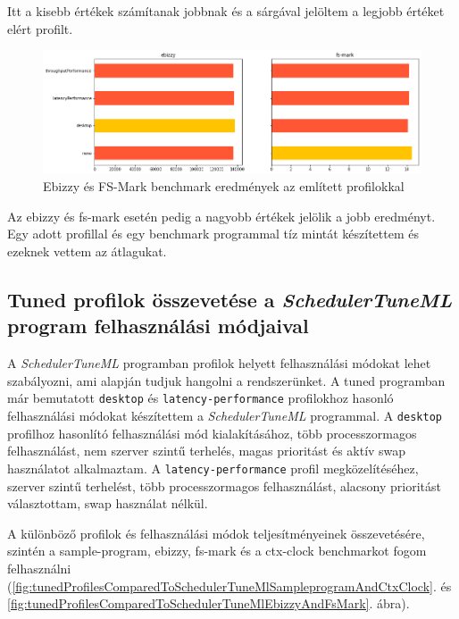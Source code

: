 Itt a kisebb értékek számítanak jobbnak és a sárgával jelöltem a legjobb értéket elért profilt.

\begin{figure}[h!]
\centering
\includegraphics[width=\textwidth]{images/ebizzyAndFsMark.png}
\caption{Ebizzy és FS-Mark benchmark eredmények az említett profilokkal}
\label{fig:tunedProfilesEbizzyAndFsmark}
\end{figure}

Az ebizzy és fs-mark esetén pedig a nagyobb értékek jelölik a jobb eredményt.
Egy adott profillal és egy benchmark programmal tíz mintát készítettem és ezeknek vettem az átlagukat.

\subsection{Tuned profilok összevetése a \textit{SchedulerTuneML} program felhasználási módjaival}

A \textit{SchedulerTuneML} programban profilok helyett felhasználási módokat lehet szabályozni, ami alapján tudjuk hangolni a rendszerünket. A tuned programban már bemutatott \texttt{desktop} és \texttt{latency-performance} profilokhoz hasonló felhasználási módokat készítettem a \textit{SchedulerTuneML} programmal. A \texttt{desktop} profilhoz hasonlító felhasználási mód kialakításához, több processzormagos felhasználást, nem szerver szintű terhelés, magas prioritást és aktív swap használatot alkalmaztam. A \texttt{latency-performance} profil megközelítéséhez, szerver szintű terhelést, több processzormagos felhasználást, alacsony prioritást választottam, swap használat nélkül.

A különböző profilok és felhasználási módok teljesítményeinek összevetésére, szintén a sample-program, ebizzy, fs-mark és a ctx-clock benchmarkot fogom felhasználni (\ref{fig:tunedProfilesComparedToSchedulerTuneMlSampleprogramAndCtxClock}. és \ref{fig:tunedProfilesComparedToSchedulerTuneMlEbizzyAndFsMark}. ábra). 

